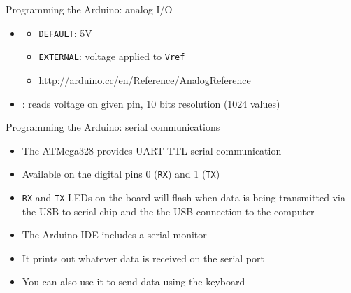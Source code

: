 \documentclass[compress]{beamer}
\begin{document}
\begin{frame}{Programming the Arduino: analog I/O}
    \begin{itemize}
        \item {}
            \begin{itemize}
                \item \texttt{DEFAULT}: 5V
                \item \texttt{EXTERNAL}: voltage applied to \texttt{Vref}
                \item \url{http://arduino.cc/en/Reference/AnalogReference}
            \end{itemize}
        \item {}: reads voltage on given pin, 10 bits
            resolution (1024 values)
    \end{itemize}

\end{frame}

\begin{frame}{Programming the Arduino: serial communications}
    \begin{itemize}
        \item The ATMega328 provides UART TTL serial communication
        \item Available on the digital pins 0 (\texttt{RX}) and 1 (\texttt{TX})
        \item \texttt{RX} and \texttt{TX} LEDs on the board will flash when data
            is being transmitted via the USB-to-serial chip and the the USB
            connection to the computer
    \end{itemize}

    \begin{itemize}
        \item The Arduino IDE includes a serial monitor
        \item It prints out whatever data is received on the serial port
        \item You can also use it to send data using the keyboard
    \end{itemize}
\end{frame}
\end{document}
